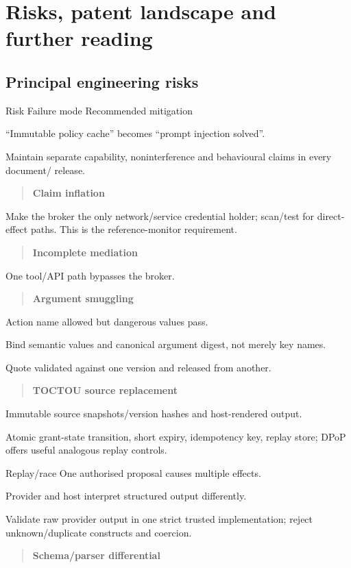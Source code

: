 \documentclass[11pt,a4paper]{article}
\begin{document}
\section*{Risks, patent landscape and further reading}
\subsection*{Principal engineering risks}
Risk Failure mode Recommended mitigation\par
“Immutable policy cache” becomes “prompt injection solved”.\par
Maintain separate capability, noninterference and behavioural claims in every document/ release.\par
\begin{quote}\textbf{Claim inflation}\end{quote}
Make the broker the only network/service credential holder; scan/test for direct-effect paths. This is the reference-monitor requirement.\par
\begin{quote}\textbf{Incomplete mediation}\end{quote}
One tool/API path bypasses the broker.\par
\begin{quote}\textbf{Argument smuggling}\end{quote}
Action name allowed but dangerous values pass.\par
Bind semantic values and canonical argument digest, not merely key names.\par
Quote validated against one version and released from another.\par
\begin{quote}\textbf{TOCTOU source replacement}\end{quote}
Immutable source snapshots/version hashes and host-rendered output.\par
Atomic grant-state transition, short expiry, idempotency key, replay store; DPoP offers useful analogous replay controls.\par
Replay/race One authorised proposal causes multiple effects.\par
Provider and host interpret structured output differently.\par
Validate raw provider output in one strict trusted implementation; reject unknown/duplicate constructs and coercion.\par
\begin{quote}\textbf{Schema/parser differential}\end{quote}
\end{document}
